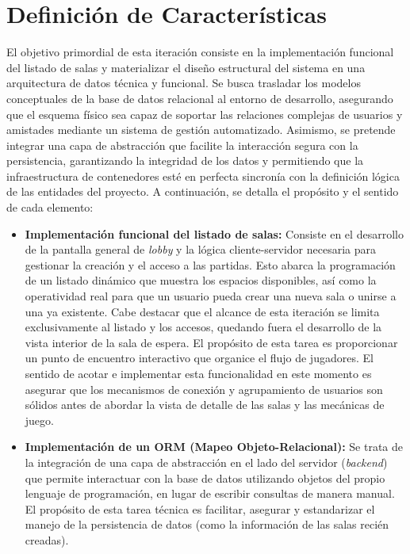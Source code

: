 \section{Definición de Características}
El objetivo primordial de esta iteración consiste en la implementación funcional del listado de salas y materializar el diseño estructural del sistema en una arquitectura de datos técnica y funcional. Se busca trasladar los modelos conceptuales de la base de datos relacional al entorno de desarrollo, asegurando que el esquema físico sea capaz de soportar las relaciones complejas de usuarios y amistades mediante un sistema de gestión automatizado. Asimismo, se pretende integrar una capa de abstracción que facilite la interacción segura con la persistencia, garantizando la integridad de los datos y permitiendo que la infraestructura de contenedores esté en perfecta sincronía con la definición lógica de las entidades del proyecto.
A continuación, se detalla el propósito y el sentido de cada elemento:

\begin{itemize}
    \item \textbf{Implementación funcional del listado de salas:} Consiste en el desarrollo de la pantalla general de \textit{lobby} y la lógica cliente-servidor necesaria para gestionar la creación y el acceso a las partidas. Esto abarca la programación de un listado dinámico que muestra los espacios disponibles, así como la operatividad real para que un usuario pueda crear una nueva sala o unirse a una ya existente. Cabe destacar que el alcance de esta iteración se limita exclusivamente al listado y los accesos, quedando fuera el desarrollo de la vista interior de la sala de espera. El propósito de esta tarea es proporcionar un punto de encuentro interactivo que organice el flujo de jugadores. El sentido de acotar e implementar esta funcionalidad en este momento es asegurar que los mecanismos de conexión y agrupamiento de usuarios son sólidos antes de abordar la vista de detalle de las salas y las mecánicas de juego.
    \item \textbf{Implementación de un ORM (Mapeo Objeto-Relacional):} Se trata de la integración de una capa de abstracción en el lado del servidor (\textit{backend}) que permite interactuar con la base de datos utilizando objetos del propio lenguaje de programación, en lugar de escribir consultas de manera manual. El propósito de esta tarea técnica es facilitar, asegurar y estandarizar el manejo de la persistencia de datos (como la información de las salas recién creadas).
\end{itemize}

